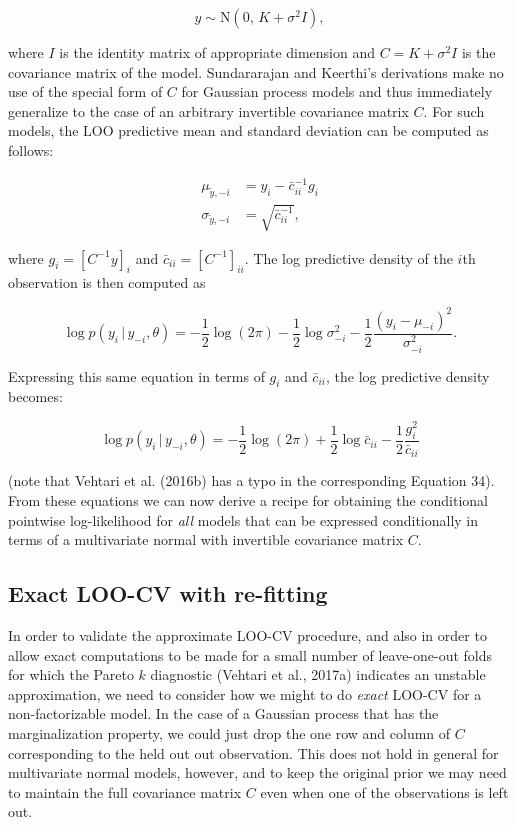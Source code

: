 \documentclass[english,,doc,floatsintext]{apa6}
\theoremstyle{definition}
\theoremstyle{definition}
\theoremstyle{definition}
\theoremstyle{remark}
\begin{document}
\begin{equation}
y \sim {\mathrm N}(0, \, K+\sigma^2 I),
\end{equation}

where \(I\) is the identity matrix of appropriate dimension and
\(C = K+\sigma^2 I\) is the covariance matrix of the model. Sundararajan
and Keerthi's derivations make no use of the special form of \(C\) for
Gaussian process models and thus immediately generalize to the case of
an arbitrary invertible covariance matrix \(C\). For such models, the
LOO predictive mean and standard deviation can be computed as follows:

\begin{align}
  \mu_{\tilde{y},-i} &= y_i-\bar{c}_{ii}^{-1} g_i \nonumber \\
  \sigma_{\tilde{y},-i} &= \sqrt{\bar{c}_{ii}^{-1}},
\end{align}

where \(g_i = \left[C^{-1} y\right]_i\) and
\(\bar{c}_{ii} = \left[C^{-1}\right]_{ii}\). The log predictive density
of the \(i\)th observation is then computed as

\begin{equation}
  \log p(y_i \,|\, y_{-i},\theta)
  = - \frac{1}{2}\log(2\pi)
  - \frac{1}{2}\log \sigma^2_{-i}
  - \frac{1}{2}\frac{(y_i-\mu_{-i})^2}{\sigma^2_{-i}}.
\end{equation}

Expressing this same equation in terms of \(g_i\) and \(\bar{c}_{ii}\),
the log predictive density becomes:

\begin{equation}
  \log p(y_i \,|\, y_{-i},\theta)
  = - \frac{1}{2}\log(2\pi)
  + \frac{1}{2}\log \bar{c}_{ii}
  - \frac{1}{2}\frac{g_i^2}{\bar{c}_{ii}}
\end{equation}

(note that Vehtari et al. (2016b) has a typo in the corresponding
Equation 34). From these equations we can now derive a recipe for
obtaining the conditional pointwise log-likelihood for \emph{all} models
that can be expressed conditionally in terms of a multivariate normal
with invertible covariance matrix \(C\).

\hypertarget{exact-loo-cv-with-re-fitting}{%
\subsection{Exact LOO-CV with
re-fitting}\label{exact-loo-cv-with-re-fitting}}

In order to validate the approximate LOO-CV procedure, and also in order
to allow exact computations to be made for a small number of
leave-one-out folds for which the Pareto \(k\) diagnostic (Vehtari et
al., 2017a) indicates an unstable approximation, we need to consider how
we might to do \emph{exact} LOO-CV for a non-factorizable model. In the
case of a Gaussian process that has the marginalization property, we
could just drop the one row and column of \(C\) corresponding to the
held out out observation. This does not hold in general for multivariate
normal models, however, and to keep the original prior we may need to
maintain the full covariance matrix \(C\) even when one of the
observations is left out.
\end{document}
